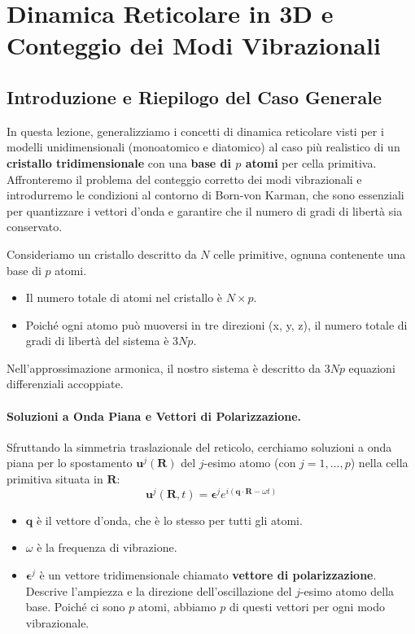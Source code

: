 \section{Dinamica Reticolare in 3D e Conteggio dei Modi Vibrazionali}

\subsection{Introduzione e Riepilogo del Caso Generale}
In questa lezione, generalizziamo i concetti di dinamica reticolare visti per i modelli unidimensionali (monoatomico e diatomico) al caso più realistico di un \textbf{cristallo tridimensionale} con una \textbf{base di \(p\) atomi} per cella primitiva. Affronteremo il problema del conteggio corretto dei modi vibrazionali e introdurremo le condizioni al contorno di Born-von Karman, che sono essenziali per quantizzare i vettori d'onda e garantire che il numero di gradi di libertà sia conservato.

Consideriamo un cristallo descritto da \(N\) celle primitive, ognuna contenente una base di \(p\) atomi.
\begin{itemize}
    \item Il numero totale di atomi nel cristallo è \(N \times p\).
    \item Poiché ogni atomo può muoversi in tre direzioni (x, y, z), il numero totale di gradi di libertà del sistema è \(3Np\).
\end{itemize}
Nell'approssimazione armonica, il nostro sistema è descritto da \(3Np\) equazioni differenziali accoppiate.

\paragraph{Soluzioni a Onda Piana e Vettori di Polarizzazione.}
Sfruttando la simmetria traslazionale del reticolo, cerchiamo soluzioni a onda piana per lo spostamento \(\mathbf{u}^{j}(\mathbf{R})\) del \(j\)-esimo atomo (con \(j=1, \dots, p\)) nella cella primitiva situata in \(\mathbf{R}\):
\[ \mathbf{u}^{j}(\mathbf{R}, t) = \boldsymbol{\epsilon}^{j} e^{i(\mathbf{q}\cdot\mathbf{R} - \omega t)} \]
\begin{itemize}
    \item \(\mathbf{q}\) è il vettore d'onda, che è lo stesso per tutti gli atomi.
    \item \(\omega\) è la frequenza di vibrazione.
    \item \(\boldsymbol{\epsilon}^{j}\) è un vettore tridimensionale chiamato \textbf{vettore di polarizzazione}. Descrive l'ampiezza e la direzione dell'oscillazione del \(j\)-esimo atomo della base. Poiché ci sono \(p\) atomi, abbiamo \(p\) di questi vettori per ogni modo vibrazionale.
\end{itemize}

